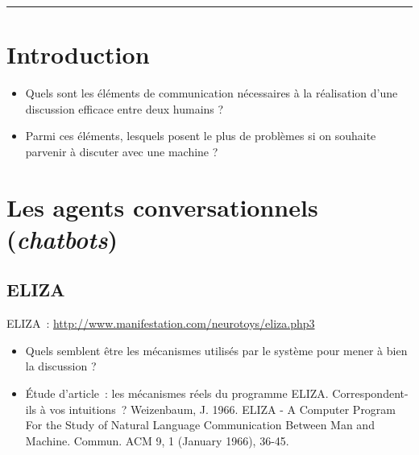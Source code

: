 
\newcommand{\numTD}{TD2}
\newcommand{\themeTD}{Chatbots et Test de Turing}


\hrule

\noindent{}

\section{Introduction}

\begin{itemize}
 \item Quels sont les éléments de communication nécessaires à la réalisation d'une discussion efficace entre deux humains ?
 \item Parmi ces éléments, lesquels posent le plus de problèmes si on souhaite parvenir à discuter avec une machine ?
\end{itemize}

\section{Les agents conversationnels (\textit{chatbots})}

\subsection{ELIZA}
ELIZA : \url{http://www.manifestation.com/neurotoys/eliza.php3}
\begin{itemize}
  \item Quels semblent être les mécanismes utilisés par le système pour mener à bien la discussion ?
  \item Étude d'article : les mécanismes réels du programme ELIZA. Correspondent-ils à vos intuitions ?
Weizenbaum, J. 1966. ELIZA - A Computer Program For the Study of Natural Language Communication Between Man and Machine. Commun. ACM 9, 1 (January 1966), 36-45.
  \end{itemize}

